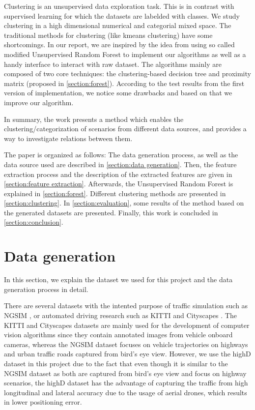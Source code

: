 \documentclass[conference]{IEEEtran}
\begin{document}
Clustering is an unsupervised data exploration task. This is in contrast with supervised learning for which the datasets are labelded with classes.
We study clustering in a high dimensional numerical and categorial mixed space. The traditional methods for clustering (like kmeans clustering) have some
shortcomings. In our report, we are inspired by the idea from \cite{kruber2018unsupervised} using so called modified Unsupervised Random Forest to
 implement our algorithms as well as a handy interface to interact with raw dataset. The algorithms mainly are composed of two core techniques: 
 the clustering-based decision tree and proximity matrix (proposed in \autoref{section:forest}). 
 According to the test results from the first version of implementation,
  we notice some drawbacks and based on that we improve our algorithm.


In summary, the work presents a method which enables the clustering/categorization of scenarios from different data sources, and provides a way to investigate relations between them.

The paper is organized as follows: The data generation process, as well as the data source used are described in \autoref{section:data generation}. Then, the feature extraction process and the description of the extracted features are given in \autoref{section:feature extraction}. Afterwards, the Unsupervised Random Forest is explained in \autoref{section:forest}. Different clustering methods are presented in \autoref{section:clustering}. In \autoref{section:evaluation}, some results of the method based on the generated datasets are presented. Finally, this work is concluded in \autoref{section:conclusion}.



\section{Data generation}
\label{section:data generation}
In this section, we explain the dataset we used for this project and the data generation process in detail. 

There are several datasets with the intented purpose of traffic simulation such as NGSIM \cite{halkias2006ngsim} \cite{colyar2007us}, or automated driving research such as KITTI \cite{geiger2013vision} and Cityscapes \cite{cordts2016cityscapes}. The KITTI and Cityscapes datasets are mainly used for the development of computer vision algorithms since they contain annotated images from vehicle onboard cameras, whereas the NGSIM dataset focuses on vehicle trajectories on highways and urban traffic roads captured from bird's eye view. However, we use the highD dataset \cite{highDdataset} in this project due to the fact that even though it is similar to the NGSIM dataset as both are captured from bird's eye view and focus on highway scenarios, the highD dataset has the advantage of capturing the traffic from high longitudinal and lateral accuracy due to the usage of aerial drones, which results in lower positioning error.
\end{document}
